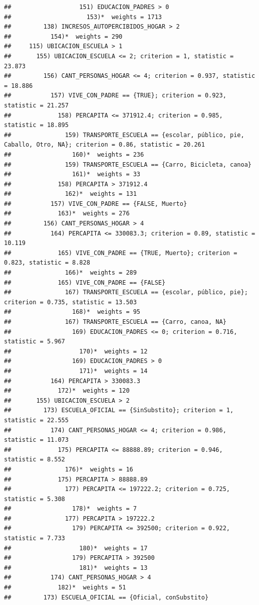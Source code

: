 \documentclass[
]{article}
\begin{document}
\begin{verbatim}
##                   151) EDUCACION_PADRES > 0
##                     153)*  weights = 1713 
##         138) INCRESOS_AUTOPERCIBIDOS_HOGAR > 2
##           154)*  weights = 290 
##     115) UBICACION_ESCUELA > 1
##       155) UBICACION_ESCUELA <= 2; criterion = 1, statistic = 23.873
##         156) CANT_PERSONAS_HOGAR <= 4; criterion = 0.937, statistic = 18.886
##           157) VIVE_CON_PADRE == {TRUE}; criterion = 0.923, statistic = 21.257
##             158) PERCAPITA <= 371912.4; criterion = 0.985, statistic = 18.895
##               159) TRANSPORTE_ESCUELA == {escolar, público, pie, Caballo, Otro, NA}; criterion = 0.86, statistic = 20.261
##                 160)*  weights = 236 
##               159) TRANSPORTE_ESCUELA == {Carro, Bicicleta, canoa}
##                 161)*  weights = 33 
##             158) PERCAPITA > 371912.4
##               162)*  weights = 131 
##           157) VIVE_CON_PADRE == {FALSE, Muerto}
##             163)*  weights = 276 
##         156) CANT_PERSONAS_HOGAR > 4
##           164) PERCAPITA <= 330083.3; criterion = 0.89, statistic = 10.119
##             165) VIVE_CON_PADRE == {TRUE, Muerto}; criterion = 0.823, statistic = 8.828
##               166)*  weights = 289 
##             165) VIVE_CON_PADRE == {FALSE}
##               167) TRANSPORTE_ESCUELA == {escolar, público, pie}; criterion = 0.735, statistic = 13.503
##                 168)*  weights = 95 
##               167) TRANSPORTE_ESCUELA == {Carro, canoa, NA}
##                 169) EDUCACION_PADRES <= 0; criterion = 0.716, statistic = 5.967
##                   170)*  weights = 12 
##                 169) EDUCACION_PADRES > 0
##                   171)*  weights = 14 
##           164) PERCAPITA > 330083.3
##             172)*  weights = 120 
##       155) UBICACION_ESCUELA > 2
##         173) ESCUELA_OFICIAL == {SinSubstito}; criterion = 1, statistic = 22.555
##           174) CANT_PERSONAS_HOGAR <= 4; criterion = 0.986, statistic = 11.073
##             175) PERCAPITA <= 88888.89; criterion = 0.946, statistic = 8.552
##               176)*  weights = 16 
##             175) PERCAPITA > 88888.89
##               177) PERCAPITA <= 197222.2; criterion = 0.725, statistic = 5.308
##                 178)*  weights = 7 
##               177) PERCAPITA > 197222.2
##                 179) PERCAPITA <= 392500; criterion = 0.922, statistic = 7.733
##                   180)*  weights = 17 
##                 179) PERCAPITA > 392500
##                   181)*  weights = 13 
##           174) CANT_PERSONAS_HOGAR > 4
##             182)*  weights = 51 
##         173) ESCUELA_OFICIAL == {Oficial, conSubstito}

\end{verbatim}
\end{document}
